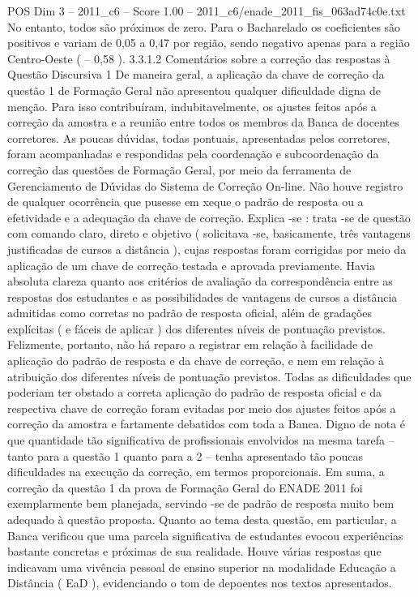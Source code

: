 \begin{textsample}{POS Dim 3 – 2011\_c6 – Score 1.00 – 2011\_c6/enade\_2011\_fis\_063ad74c0e.txt}
No entanto, todos são próximos de zero.
Para o Bacharelado os coeficientes são positivos e variam de 0,05 a 0,47 por região, sendo negativo apenas para a região Centro-Oeste ( – 0,58 ). 3.3.1.2 Comentários sobre a correção das respostas à Questão Discursiva 1 De maneira geral, a aplicação da chave de correção da questão 1 de Formação Geral não apresentou qualquer dificuldade digna de menção.
Para isso contribuíram, indubitavelmente, os ajustes feitos após a correção da amostra e a reunião entre todos os membros da Banca de docentes corretores.
As poucas dúvidas, todas pontuais, apresentadas pelos corretores, foram acompanhadas e respondidas pela coordenação e subcoordenação da correção das questões de Formação Geral, por meio da ferramenta de Gerenciamento de Dúvidas do Sistema de Correção On-line.
Não houve registro de qualquer ocorrência que pusesse em xeque o padrão de resposta ou a efetividade e a adequação da chave de correção.
Explica -se : trata -se de questão com comando claro, direto e objetivo ( solicitava -se, basicamente, três vantagens justificadas de cursos a distância ), cujas respostas foram corrigidas por meio da aplicação de um chave de correção testada e aprovada previamente.
Havia absoluta clareza quanto aos critérios de avaliação da correspondência entre as respostas dos estudantes e as possibilidades de vantagens de cursos a distância admitidas como corretas no padrão de resposta oficial, além de gradações explícitas ( e fáceis de aplicar ) dos diferentes níveis de pontuação previstos.
Felizmente, portanto, não há reparo a registrar em relação à facilidade de aplicação do padrão de resposta e da chave de correção, e nem em relação à atribuição dos diferentes níveis de pontuação previstos.
Todas as dificuldades que poderiam ter obstado a correta aplicação do padrão de resposta oficial e da respectiva chave de correção foram evitadas por meio dos ajustes feitos após a correção da amostra e fartamente debatidos com toda a Banca.
Digno de nota é que quantidade tão significativa de profissionais envolvidos na mesma tarefa – tanto para a questão 1 quanto para a 2 – tenha apresentado tão poucas dificuldades na execução da correção, em termos proporcionais.
Em suma, a correção da questão 1 da prova de Formação Geral do ENADE 2011 foi exemplarmente bem planejada, servindo -se de padrão de resposta muito bem adequado à questão proposta.
Quanto ao tema desta questão, em particular, a Banca verificou que uma parcela significativa de estudantes evocou experiências bastante concretas e próximas de sua realidade.
Houve várias respostas que indicavam uma vivência pessoal de ensino superior na modalidade Educação a Distância ( EaD ), evidenciando o tom de depoentes nos textos apresentados.

\end{textsample}
